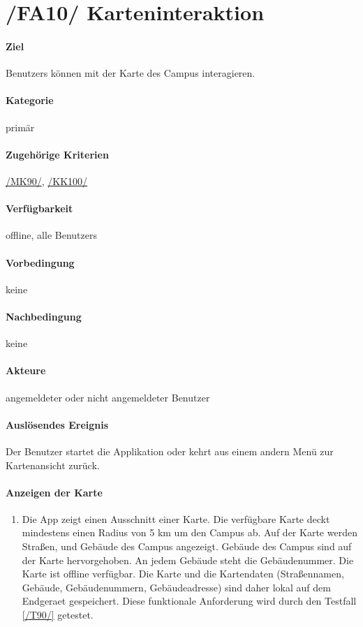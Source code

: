 \section[Karteninteraktion]{/FA10/ Karteninteraktion}
\label{/FA10/}
\paragraph{Ziel}
\Glspl{Benutzer} können mit der \Gls{Karte} des \Gls{Campus} interagieren.
\paragraph{Kategorie}
primär
\paragraph{Zugehörige Kriterien}
\hyperref[/MK90/]{/MK90/}, \hyperref[/KK100/]{/KK100/}
\paragraph{Verfügbarkeit}
\gls{offline}, alle \Glspl{Benutzer}
\paragraph{Vorbedingung}
keine
\paragraph{Nachbedingung}
keine
\paragraph{Akteure}
angemeldeter oder nicht angemeldeter \Gls{Benutzer}
\paragraph{Auslösendes Ereignis}
Der \Gls{Benutzer} startet die Applikation oder kehrt aus einem andern Menü zur \Gls{Kartenansicht} zurück.
\paragraph{Anzeigen der Karte}
\begin{enumerate}[start=11, label=\textbf{/FA\arabic*/}, align=left]
    \item \label{/FA11/} Die App zeigt einen Ausschnitt einer \Gls{Karte}. Die verfügbare \Gls{Karte} deckt mindestens einen Radius von 5 km um den \Gls{Campus} ab. Auf der \Gls{Karte} werden Straßen, und Gebäude des \Gls{Campus} angezeigt. Gebäude des \Gls{Campus} sind auf der \Gls{Karte} hervorgehoben. An jedem Gebäude steht die Gebäudenummer. Die \Gls{Karte} ist \gls{offline} verfügbar. Die \Gls{Karte} und die Kartendaten (Straßennamen, Gebäude, Gebäudenummern, Gebäudeadresse) sind daher \gls{lokal} auf dem \Gls{Endgeraet} gespeichert. Diese funktionale Anforderung wird durch den Testfall \ref{/T90/} getestet.
\end{enumerate}
